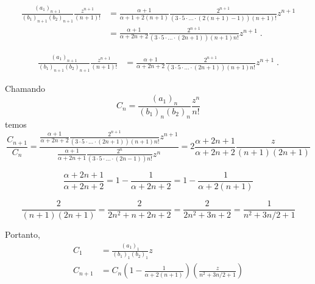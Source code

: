 \documentclass[10pt,a4paper]{article}%
\begin{document}
\begin{equation}
\begin{split}
\frac{(a_1)_{n+1}}{(b_1)_{n+1}(b_2)_{n+1}}
   \frac{z^{n+1}}{(n+1)!}
   &= \frac{\alpha+1}{\alpha+1+2(n+1)} \frac{2^{n+1}}{\left(3\cdot 5\cdot\ldots\cdot \left(2(n+1)-1\right)\right)(n+1)!} z^{n+1} \\
   &= \frac{\alpha+1}{\alpha+2n+2} \frac{2^{n+1}}{\left(3\cdot 5\cdot\ldots\cdot \left(2n+1\right)\right)(n+1)n!} z^{n+1}
  \;.
\end{split}
\end{equation}

\begin{equation}
\begin{split}
\frac{(a_1)_{n+1}}{(b_1)_{n+1}(b_2)_{n+1}}
   \frac{z^{n+1}}{(n+1)!}
   &= \frac{\alpha+1}{\alpha+2n+2} \frac{2^{n+1}}{\left(3\cdot 5\cdot\ldots\cdot \left(2n+1\right)\right)(n+1)n!} z^{n+1}
  \;.
\end{split}
\end{equation}

Chamando
\begin{equation}
C_n = \frac{(a_1)_n}{(b_1)_n(b_2)_n} \frac{z^n}{n!}
\end{equation}
temos
\begin{equation}
\frac{C_{n+1}}{C_n}=
\frac{\frac{\alpha+1}{\alpha+2n+2} \frac{2^{n+1}}{\left(3\cdot 5\cdot\ldots\cdot \left(2n+1\right)\right)(n+1)n!} z^{n+1}}{\frac{\alpha+1}{\alpha+2n+1} \frac{2^n}{\left(3\cdot 5\cdot\ldots\cdot \left(2n-1\right)\right)n!} z^n}
=2\frac{\alpha+2n+1}{\alpha+2n+2}\frac{z}{(n+1)(2n+1)}
\end{equation}

\begin{equation}
\frac{\alpha+2n+1}{\alpha+2n+2} = 1 - \frac{1}{\alpha+2n+2} = 1 - \frac{1}{\alpha+2(n+1)}
\end{equation}

\begin{equation}
\frac{2}{(n+1)(2n+1)} = \frac{2}{2n^2+n+2n+2} = \frac{2}{2n^2+3n+2} = \frac{1}{n^2+3n/2+1}
\end{equation}

Portanto,
\begin{equation}
\begin{split}
C_1 &= \frac{(a_1)_1}{(b_1)_1(b_2)_1} z \\
C_{n+1} &=  C_n \left(1 - \frac{1}{\alpha+2(n+1)}\right)
\left(\frac{z}{n^2+3n/2+1}\right) \\
\end{split}
\end{equation}
\end{document}

